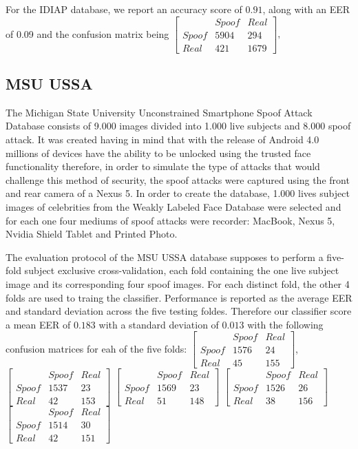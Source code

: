 For the IDIAP database, we report an accuracy score of $0.91$, along with an EER of 0.09 and the confusion matrix being 
$
[
\begin{smallmatrix}
&Spoof & Real\\
Spoof & 5904 & 294\\
Real & 421 & 1679
\end{smallmatrix}], 
$

\subsection{MSU USSA}
The Michigan State University Unconstrained Smartphone Spoof Attack Database consists of 9.000 images divided into 1.000 live subjects and 8.000 spoof attack. It was created having in mind that with the release of Android 4.0 millions of devices have the ability to be unlocked using the trusted face functionality therefore, in order to simulate the type of attacks that would challenge this method of security, the spoof attacks were captured using the front and rear camera of a Nexus 5. In order to create the database, 1.000 lives subject images of celebrities from the Weakly Labeled Face Database were selected and for each one four mediums of spoof attacks were recorder: MacBook, Nexus 5, Nvidia Shield Tablet and Printed Photo. 

The evaluation protocol of the MSU USSA database supposes to perform a five-fold subject exclusive cross-validation, each fold containing the one live subject image and its corresponding four spoof images. For each distinct fold, the other 4 folds are used to traing the classifier. Performance is reported as the average EER and standard deviation across the five testing foldes. Therefore our classifier score a mean EER of $0.183$ with a standard deviation of $0.013$ with the following confusion matrices for eah of the five folds:
$
[
\begin{smallmatrix}
&Spoof & Real\\
Spoof & 1576 & 24\\
Real & 45 & 155
\end{smallmatrix}]
$, 
$
[
\begin{smallmatrix}
&Spoof & Real\\
Spoof & 1537 & 23\\
Real & 42 & 153
\end{smallmatrix}]
$
$
[
\begin{smallmatrix}
&Spoof & Real\\
Spoof & 1569 & 23\\
Real & 51 & 148
\end{smallmatrix}] 
$
$
[
\begin{smallmatrix}
&Spoof & Real\\
Spoof & 1526 & 26\\
Real & 38 & 156
\end{smallmatrix}] 
$
$
[
\begin{smallmatrix}
&Spoof & Real\\
Spoof & 1514 & 30\\
Real & 42 & 151
\end{smallmatrix}] 
$



